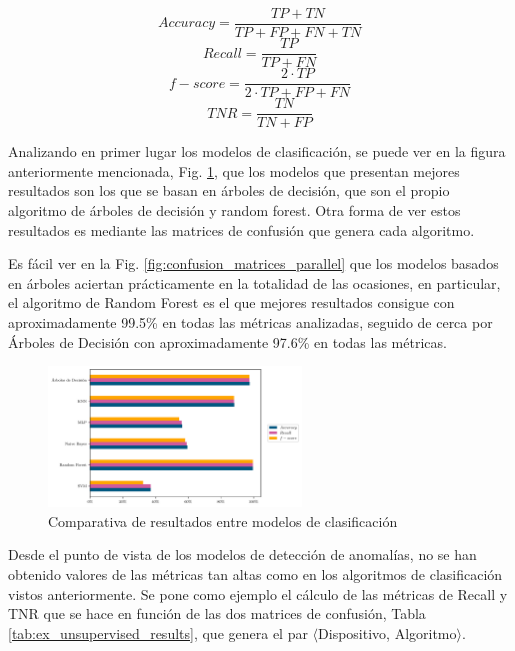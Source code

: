 \begin{multicols}{2}
\begin{equation}
    Accuracy = \frac{TP + TN}{TP + FP + FN + TN}
    \label{eq:accur}
\end{equation}
\begin{equation}
    Recall = \frac{TP}{TP + FN}
    \label{eq:recall}
\end{equation}
\begin{equation}
    f-score = \frac{2 \cdot TP}{2 \cdot TP + FP + FN}
\end{equation}
\begin{equation}
    TNR = \frac{TN}{TN + FP}
    \label{eq:tnr}
\end{equation}
\end{multicols}

Analizando en primer lugar los modelos de clasificación, se puede ver en la figura anteriormente mencionada, Fig. \ref{fig:comp_accur}, que los modelos que presentan mejores resultados son los que se basan en árboles de decisión, que son el propio algoritmo de árboles de decisión y random forest. Otra forma de ver estos resultados es mediante las matrices de confusión que genera cada algoritmo.

Es fácil ver en la Fig. \ref{fig:confusion_matrices_parallel} que los modelos basados en árboles aciertan prácticamente en la totalidad de las ocasiones, en particular, el algoritmo de Random Forest es el que mejores resultados consigue con aproximadamente 99.5\% en todas las métricas analizadas, seguido de cerca por Árboles de Decisión con aproximadamente 97.6\% en todas las métricas.

\begin{figure}
    \centering
    \includegraphics[width=0.6\textwidth]{../Python/plots/parallel/model_results}
    \caption{Comparativa de resultados entre modelos de clasificación}
    \label{fig:comp_accur}
\end{figure}

Desde el punto de vista de los modelos de detección de anomalías, no se han obtenido valores de las métricas tan altas como en los algoritmos de clasificación vistos anteriormente. Se pone como ejemplo el cálculo de las métricas de Recall y TNR que se hace en función de las dos matrices de confusión, Tabla \ref{tab:ex_unsupervised_results}, que genera el par $\langle
$Dispositivo, Algoritmo$\rangle$.

